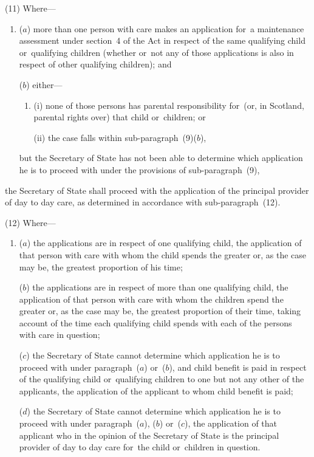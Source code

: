 \documentclass[a4paper,12pt]{article}
\begin{document}
(11) Where—
\begin{enumerate}\item[]
($a$) more than one person with care makes an application for~a maintenance assessment under section~4 of the Act in respect of the same qualifying child or~qualifying children (whether or~not any of those applications is also in respect of other qualifying children); and

($b$) either—
\begin{enumerate}\item[]
(i) none of those persons has parental responsibility for~(or, in Scotland, parental rights over) that child or~children; or

(ii) the case falls within sub-paragraph~(9)($b$),
\end{enumerate}
but 
the Secretary of State  %
has not been able to determine which application he is to proceed with under the provisions of sub-paragraph~(9),
\end{enumerate}
the Secretary of State  %
shall proceed with the application of the principal provider of day to day care, as determined in accordance with sub-paragraph~(12).

(12) Where—
\begin{enumerate}\item[]
($a$) the applications are in respect of one qualifying child, the application of that person with care with whom the child spends the greater or, as the case may be, the greatest proportion of his time;

($b$) the applications are in respect of more than one qualifying child, the application of that person with care with whom the children spend the greater or, as the case may be, the greatest proportion of their time, taking account of the time each qualifying child spends with each of the persons with care in question;

($c$) 
the Secretary of State  %
cannot determine which application he is to proceed with under paragraph~($a$) or~($b$), and child benefit is paid in respect of the qualifying child or~qualifying children to one but not any other of the applicants, the application of the applicant to whom child benefit is paid;

($d$) 
the Secretary of State  %
cannot determine which application he is to proceed with under paragraph~($a$), ($b$) or~($c$), the application of that applicant who in the opinion of 
the Secretary of State  %
is the principal provider of day to day care for~the child or~children in question.
\end{enumerate}
\end{document}
